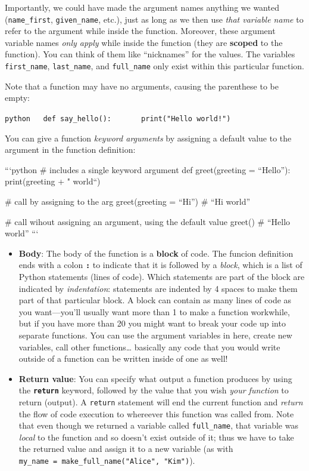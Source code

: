 \documentclass[]{book}
\begin{document}
Importantly, we could have made the argument names anything we wanted
(\texttt{name\_first}, \texttt{given\_name}, etc.), just as long as we
then use \emph{that variable name} to refer to the argument while inside
the function. Moreover, these argument variable names \emph{only apply}
while inside the function (they are \textbf{scoped} to the function).
You can think of them like ``nicknames'' for the values. The variables
\texttt{first\_name}, \texttt{last\_name}, and \texttt{full\_name} only
exist within this particular function.

Note that a function may have no arguments, causing the parenthese to be
empty:

\texttt{python\ \ \ def\ say\_hello():\ \ \ \ \ \ \ print("Hello\ world!")}

You can give a function \emph{keyword arguments} by assigning a default
value to the argument in the function definition:

```python \# includes a single keyword argument def greet(greeting =
``Hello''): print(greeting + " world``)

\# call by assigning to the arg greet(greeting = ``Hi'') \# ``Hi world''

\# call wihout assigning an argument, using the default value greet() \#
``Hello world'' ```

\begin{itemize}
\item
  \textbf{Body}: The body of the function is a \textbf{block} of code.
  The funcion definition ends with a colon \textbf{\texttt{:}} to
  indicate that it is followed by a \emph{block}, which is a list of
  Python statements (lines of code). Which statements are part of the
  block are indicated by \emph{indentation}: statements are indented by
  4 spaces to make them part of that particular block. A block can
  contain as many lines of code as you want---you'll usually want more
  than 1 to make a function workwhile, but if you have more than 20 you
  might want to break your code up into separate functions. You can use
  the argument variables in here, create new variables, call other
  functions\ldots{} basically any code that you would write outside of a
  function can be written inside of one as well!
\item
  \textbf{Return value}: You can specify what output a function produces
  by using the \textbf{\texttt{return}} keyword, followed by the value
  that you wish \emph{your function} to return (output). A
  \texttt{return} statement will end the current function and
  \emph{return} the flow of code execution to whereever this function
  was called from. Note that even though we returned a variable called
  \texttt{full\_name}, that variable was \emph{local} to the function
  and so doesn't exist outside of it; thus we have to take the returned
  value and assign it to a new variable (as with
  \texttt{my\_name\ =\ make\_full\_name("Alice",\ "Kim")}).
\end{itemize}
\end{document}
